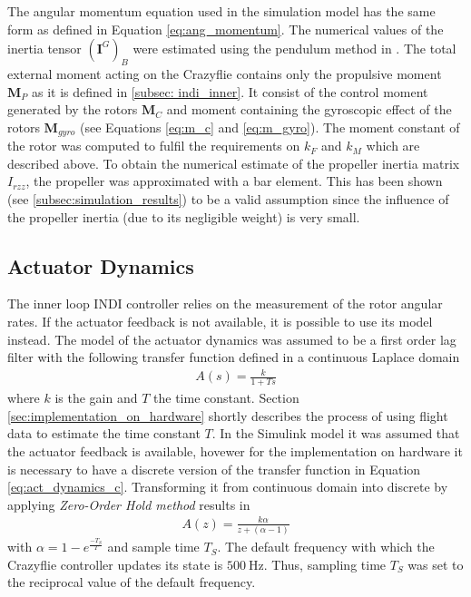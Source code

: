 \documentclass[11pt, a4paper, twoside]{report}
\begin{document}
The angular momentum equation used in the simulation model has the same form as defined in Equation \ref{eq:ang_momentum}. The numerical values of the inertia tensor $(\bm{I}^G)_B$ were estimated using the pendulum method in \cite{foerster}. The total external moment acting on the Crazyflie contains only the propulsive moment $\bm{M}_P$ as it is defined in \ref{subsec: indi_inner}. It consist of the control moment generated by the rotors $\bm{M}_C$  and moment containing the gyroscopic effect of the rotors $\bm{M}_{gyro}$ (see Equations \ref{eq:m_c} and \ref{eq:m_gyro}). The moment constant of the rotor was computed to fulfil the requirements on $k_F$ and $k_M$ which are described above. To obtain the numerical estimate of the propeller inertia matrix $I_{rzz}$, the propeller was approximated with a bar element. This has been shown (see \ref{subsec:simulation_results}) to be a valid assumption since the influence of the propeller inertia (due to its negligible weight) is very small.

\subsection{Actuator Dynamics} \label{subsec:actuator_dynamics}

The inner loop \acrshort{INDI} controller relies on the measurement of the rotor angular rates. If the actuator feedback is not available, it is possible to use its model instead. The model of the actuator dynamics was assumed to be a first order lag filter with the following transfer function defined in a continuous Laplace domain
\begin{equation}
	\begin{split}
		A(s) = \frac{k}{1+Ts}
		\label{eq:act_dynamics_c}
	\end{split}
\end{equation}
where $k$ is the gain and $T$ the time constant. Section \ref{sec:implementation_on_hardware} shortly describes the process of using flight data to estimate the time constant $T$. In the Simulink model it was assumed that the actuator feedback is available, hovewer for the implementation on hardware it is necessary to have a discrete version of the transfer function in Equation \ref{eq:act_dynamics_c}. Transforming it from continuous domain into discrete by applying \textit{Zero-Order Hold method} results in
\begin{equation}
	\begin{split}
		A(z) = \frac{k\alpha}{z+(\alpha-1)}
		\label{eq:act_dynamics_d}
	\end{split}
\end{equation}
with $\alpha = 1-e^{\frac{-T_S}{T}}$ and sample time $T_S$. The default frequency with which the Crazyflie controller updates its state is $500~\si{\Hz}$. Thus, sampling time $T_S$ was set to the reciprocal value of the default frequency. 
\end{document}
